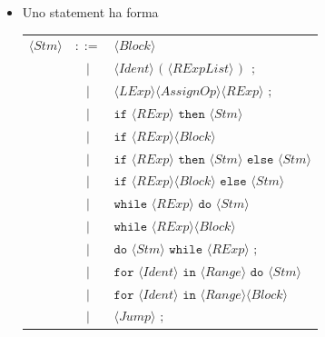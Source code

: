 \documentclass{report}
\newcommand{\nonterm}[1]{\langle #1 \rangle}
\newcommand{\term}[1]{\texttt{#1}}
\begin{document}
\begin{itemize}
    \item Uno statement ha forma
        \begin{flushleft}
        \begin{tabular}{l c l}
        $\nonterm{Stm}$     &   $::=$   &   $\nonterm{Block}$                                                                   \\
                            &    $|$    &   $\nonterm{Ident} \term{ ( } \nonterm{RExpList} \term{ ) } \term{ ;}$                \\
                            &    $|$    &   $\nonterm{LExp} \nonterm{AssignOp} \nonterm{RExp} \term{ ;}$                        \\
                            &    $|$    &   $\term{if } \nonterm{RExp} \term{ then } \nonterm{Stm}$                             \\
                            &    $|$    &   $\term{if } \nonterm{RExp} \nonterm{Block}$                                         \\
                            &    $|$    &   $\term{if } \nonterm{RExp} \term{ then } \nonterm{Stm} \term{ else } \nonterm{Stm}$ \\
                            &    $|$    &   $\term{if } \nonterm{RExp} \nonterm{Block} \term{ else } \nonterm{Stm}$             \\
                            &    $|$    &   $\term{while } \nonterm{RExp} \term{ do } \nonterm{Stm}$                            \\
                            &    $|$    &   $\term{while } \nonterm{RExp} \nonterm{Block}$                                      \\
                            &    $|$    &   $\term{do } \nonterm{Stm} \term{ while } \nonterm{RExp} \term{ ;}$                  \\
                            &    $|$    &   $\term{for } \nonterm{Ident} \term{ in } \nonterm{Range} \term{ do } \nonterm{Stm}$ \\
                            &    $|$    &   $\term{for } \nonterm{Ident} \term{ in } \nonterm{Range} \nonterm{Block}$           \\
                            &    $|$    &   $\nonterm{Jump} \term{ ;}$                                                          \\

\end{tabular}
\end{flushleft}
\end{itemize}
\end{document}
